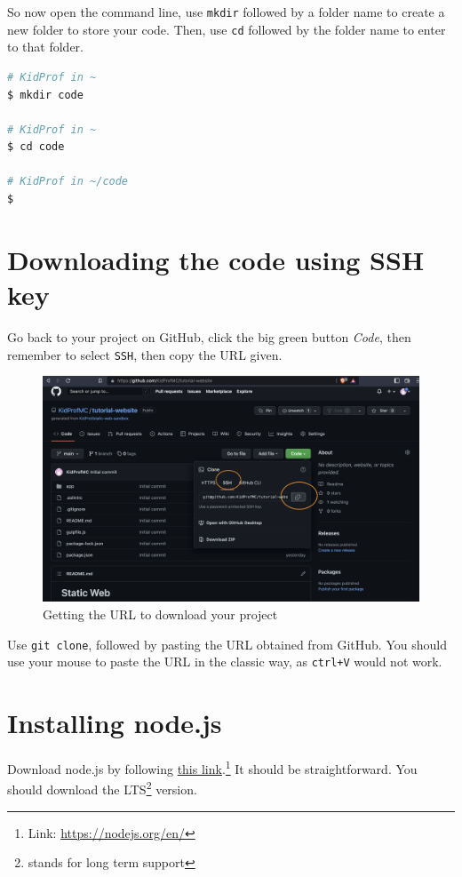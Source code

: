 So now open the command line, use \texttt{mkdir} followed by a folder name to create a new folder to store your code. Then, use \texttt{cd} followed by the folder name to enter to that folder.

\begin{lstlisting}[language=bash]
# KidProf in ~
$ mkdir code

# KidProf in ~
$ cd code

# KidProf in ~/code
$ 
\end{lstlisting}

\section{Downloading the code using SSH key}

Go back to your project on GitHub, click the big green button \textit{Code}, then remember to select \texttt{SSH}, then copy the URL given.

\begin{figure}[h]
\centering
\includegraphics[width=15cm]{images/ch1-git-clone.png}
\caption{Getting the URL to download your project}
\end{figure}

Use \texttt{git clone}, followed by pasting the URL obtained from GitHub. You should use your mouse to paste the URL in the classic way, as \texttt{ctrl+V} would not work.

\section{Installing node.js}
\label{sec:install7}

Download node.js by following \href{https://nodejs.org/en/}{this link}.\footnote{Link: \url{https://nodejs.org/en/}} It should be straightforward. You should download the LTS\footnote{stands for long term support} version.

